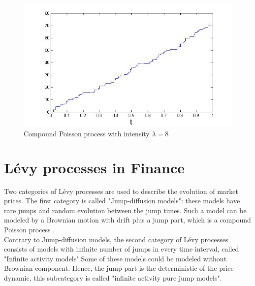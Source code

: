 \documentclass[12pt]{report}
\begin{document}
\begin{figure}[h]

\centering
\includegraphics[scale=0.7]{compoisson.jpg} 
\caption{Compound Poisson process with intensity $\lambda=8$
}
\end{figure}

\section{Lévy processes in Finance}

Two categories of Lévy processes are used to describe the evolution of market prices. 
The first category is called "Jump-diffusion models": these models have rare jumps and random evolution between the jump times. Such a model can be modeled by a Brownian motion with drift plus a jump part, which is a compound Poisson process .\\

Contrary to Jump-diffusion models, the second category of Lévy processes consists of models with infinite number of jumps in every time interval, called "Infinite activity models".Some of these models could be modeled without Brownian component. Hence, the jump part is the deterministic of the price dynamic, this subcategory is called "infinite activity pure jump models". 
\end{document}
